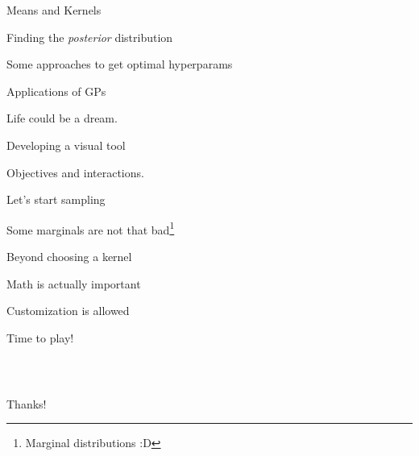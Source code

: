 \documentclass[xcolor=dvipsnames,t,aspectratio=169]{beamer} %
\newcommand{\highlight}[1]{{\color{fgv_light_blue} #1}}
\begin{document}
\begin{frame}[c]{\highlight{Means} and \highlight{Kernels}}
    
\end{frame}

\begin{frame}[c]{Finding the \highlight{\textit{posterior} distribution}}
    
\end{frame}

\begin{frame}[c]{Some \highlight{approaches} to get \highlight{optimal} hyperparams}
    
\end{frame}

\begin{frame}[c]{Applications of \highlight{GPs}}
    
\end{frame}

\begin{frame}[c]{Life \highlight{could} be a dream.}
\end{frame}

\begin{frame}[c]{Developing a \highlight{visual} tool}
    
\end{frame}

\begin{frame}[c]{Objectives \highlight{and} interactions.}
    
\end{frame}

\begin{frame}[c]{Let's start \highlight{sampling}}
    
\end{frame}

\begin{frame}[c]{Some \highlight{marginals} are not that bad\footnote{Marginal distributions :D}}
    
\end{frame}

\begin{frame}[c]{Beyond \highlight{choosing} a kernel}
    
\end{frame}

\begin{frame}[c]{Math is actually \highlight{important}}
    
\end{frame}

\begin{frame}[c]{Customization \highlight{is} allowed}
    
\end{frame}

\begin{frame}[c]{Time to \highlight{play}!}
    
\end{frame}

\begin{frame}[c]
\frametitle{~}
    
    \begin{center}
        {\Huge Thanks!}
    \end{center}
    
\end{frame}
\end{document}

